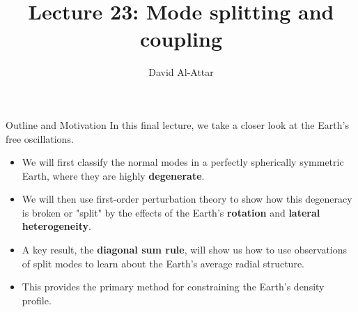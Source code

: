\documentclass{beamer}
\title[Lecture 23: Mode splitting and coupling]{Lecture 23: Mode splitting and coupling}
\author{David Al-Attar}
\institute{Michaelmas term 2024}
\date{}
\begin{document}

\begin{frame}
    \titlepage
\end{frame}

\begin{frame}{Outline and Motivation}
    In this final lecture, we take a closer look at the Earth's free oscillations.
    \begin{itemize}
        \item We will first classify the normal modes in a perfectly spherically symmetric Earth, where they are highly \textbf{degenerate}.
        \pause
        \item We will then use first-order perturbation theory to show how this degeneracy is broken or "split" by the effects of the Earth's \textbf{rotation} and \textbf{lateral heterogeneity}.
        \pause
        \item A key result, the \textbf{diagonal sum rule}, will show us how to use observations of split modes to learn about the Earth's average radial structure.
        \pause
        \item This provides the primary method for constraining the Earth's density profile.
    \end{itemize}
\end{frame}

\end{document}
